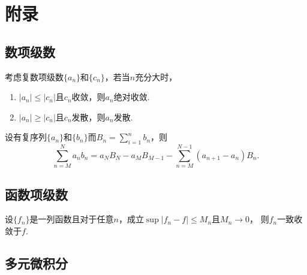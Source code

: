 
\newpage
\section{附录}

\subsection{数项级数}

  \begin{thm}
    考虑复数项级数$\{a_n\}$和$\{c_n\}$，若当$n$充分大时，
    \begin{enumerate}
      \item $|a_n| \le |c_n|$且$c_n$收敛，则$a_n$绝对收敛.
      \item $|a_n| \ge |c_n|$且$c_n$发散，则$a_n$发散.
    \end{enumerate}
  \end{thm}

  \begin{thm}[分部求和]
    \label{thm: 分部求和}
    设有复序列$\{a_n\}$和$\{b_n\}$而$B_n=\sum_{i=1}^nb_n$，则
    \[
      \sum_{n=M}^N a_nb_n = a_NB_N - a_MB_{M-1} -
      \sum_{n=M}^{N-1}(a_{n+1}-a_n)B_n.
    \]
  \end{thm}

\subsection{函数项级数}

  \begin{thm}
    设$\{f_n\}$是一列函数且对于任意$n$，成立$\sup|f_n-f|\le M_n$且$M_n\to 0$，
    则$f_n$一致收敛于$f$.
  \end{thm}

\subsection{多元微积分}

